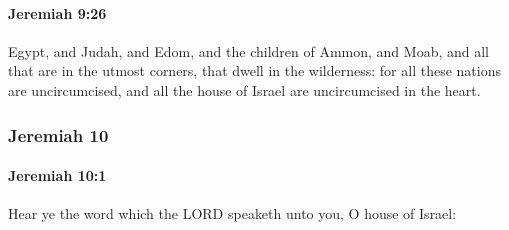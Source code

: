 		\paragraph{Jeremiah 9:26} %
			\label{JEREMIAH-9-26}

			Egypt, and Judah, and Edom, and the children of Ammon, and Moab, and all that are in the utmost corners, that dwell in the wilderness: for all these nations are uncircumcised, and all the house of Israel are uncircumcised in the heart.

	\subsubsection{Jeremiah 10} %
		\label{JEREMIAH-10}

		\paragraph{Jeremiah 10:1} %
			\label{JEREMIAH-10-1}

			Hear ye the word which the LORD speaketh unto you, O house of Israel:


